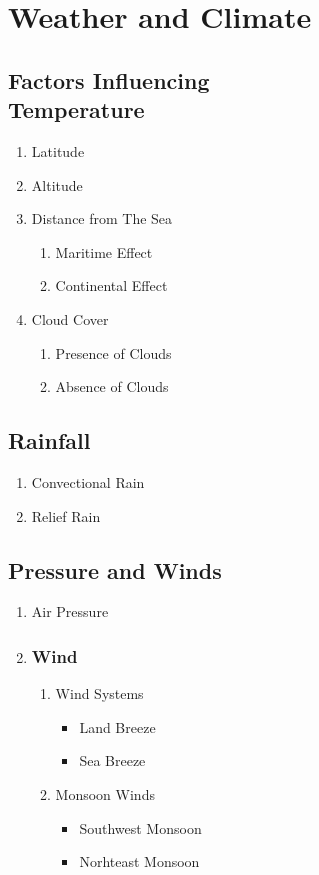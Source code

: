 \documentclass[oneside]{book}
\begin{document}
\chapter{Weather and Climate}
\begin{minipage}{0.5\textwidth}
    \section{Factors Influencing\\ Temperature}
\begin{enumerate}
    \item Latitude
    \item Altitude
    \item Distance from The Sea
    \begin{enumerate}
        \item Maritime Effect
        \item Continental Effect
    \end{enumerate}
    \item Cloud Cover
    \begin{enumerate}
        \item Presence of Clouds
        \item Absence of Clouds
    \end{enumerate}
\end{enumerate}
\section{Rainfall}
\begin{enumerate}
    \item Convectional Rain
    \item Relief Rain
\end{enumerate}
\section{Pressure and Winds}
\begin{enumerate}
    \item Air Pressure
    \item \normalsize \subsection*{\normalsize Wind}
    \begin{enumerate}
        \item Wind Systems
        \begin{itemize}
            \item Land Breeze
            \item Sea Breeze
        \end{itemize}
        \item Monsoon Winds
        \begin{itemize}
            \item Southwest Monsoon
            \item Norhteast Monsoon
        \end{itemize}
    \end{enumerate}
\end{enumerate}

\end{minipage}
\end{document}
